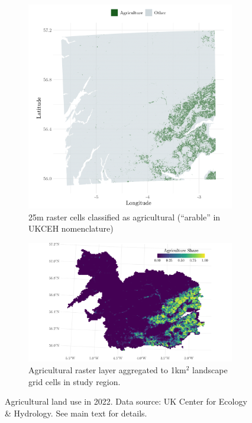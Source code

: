 \begin{figure}
    \begin{subfigure}{0.39\linewidth}
        \includegraphics[width=\linewidth]{output/figures/lcm_in_study_area.png}
        \caption{25m raster cells classified as agricultural (``arable'' in UKCEH nomenclature)}
        \label{fig:ukceh-lcm-raw}    
    \end{subfigure}
    \begin{subfigure}{0.6\linewidth}
        \includegraphics[width=\linewidth]{output/figures/lcm_agg_river_grid.pdf}
        \caption{Agricultural raster layer aggregated to 1km$^2$ landscape grid cells in study region.}    
        \label{fig:ukceh-lcm-agg}
    \end{subfigure}
    \caption{Agricultural land use in 2022. Data source: UK Center for Ecology \& Hydrology. See main text for details.}
\end{figure}

